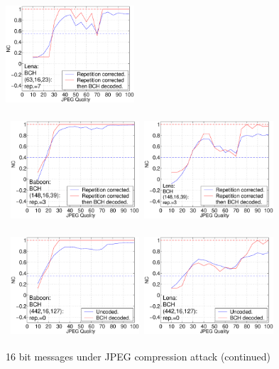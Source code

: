 \documentclass[12pt]{report}
\begin{document}
\begin{figure}[p]
{{\includegraphics[height=3.81cm,width=4.8cm]{EPS_BK_formattedBetter/JPGlen63.eps}\\
}}
\centerline{ \hbox{
\includegraphics[height=3.81cm,width=4.8cm]{EPS_BK_formattedBetter/JPGbab148.eps}
\includegraphics[height=3.81cm,width=4.8cm]{EPS_BK_formattedBetter/JPGlen148.eps}\\
}}
\centerline{ \hbox{
\includegraphics[height=3.81cm,width=4.8cm]{EPS_BK_formattedBetter/JPGbab442.eps}
\includegraphics[height=3.81cm,width=4.8cm]{EPS_BK_formattedBetter/JPGlen442.eps}
}}
\caption{16 bit messages under JPEG compression attack (continued)}
\label{figs:JPGblBK}
\setlength{\abovecaptionskip}{0cm}
\end{figure}
\end{document}
